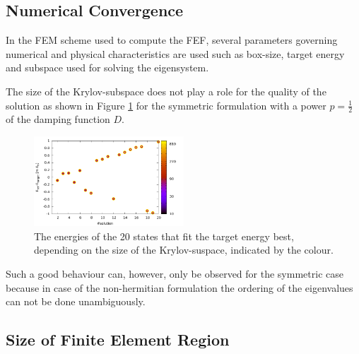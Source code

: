 \subsection{Numerical Convergence}
In the FEM scheme used to compute the FEF, several parameters governing numerical and physical characteristics are used such as box-size, target energy and subspace used for solving the eigensystem.

The size of the Krylov-subspace does not play a role for the quality of the solution as shown in Figure \ref{fig:E_nev} for the symmetric formulation with a power $p=\frac 12$ of the damping function $D$.
\begin{figure}
\includegraphics[width=0.5\textwidth]{Figures/Root_E_nev.pdf}
\caption{The energies of the 20 states that fit the target energy best, depending on the
size of the Krylov-suspace, indicated by the colour.}
\label{fig:E_nev}
\end{figure}
Such a good behaviour can, however, only be observed for the symmetric case because in case of the non-hermitian formulation the ordering of the eigenvalues can not be done unambiguously.

\subsection{Size of Finite Element Region}
